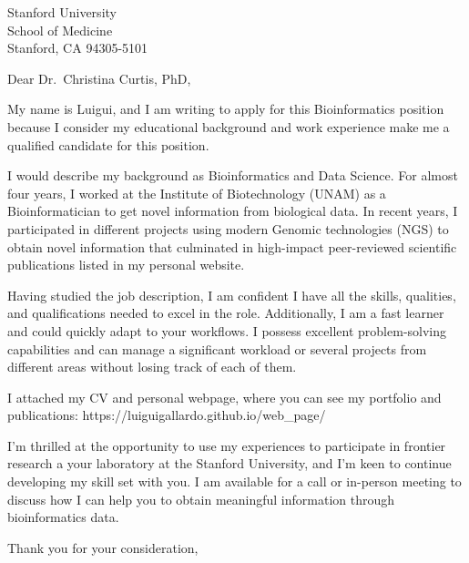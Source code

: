 \documentclass[version=last,12pt,{"/Library/Frameworks/R.framework/Versions/4.1-arm64/Resources/library/komaletter/rmarkdown/templates/pdf/resources/maintainersDelight"},]{scrlttr2}
\begin{document}
\begin{letter}{Stanford University\\School of Medicine\\Stanford, CA
94305-5101}
\opening{Dear Dr.~Christina Curtis, PhD,}

My name is Luigui, and I am writing to apply for this Bioinformatics
position because I consider my educational background and work
experience make me a qualified candidate for this position.

I would describe my background as Bioinformatics and Data Science. For
almost four years, I worked at the Institute of Biotechnology (UNAM) as
a Bioinformatician to get novel information from biological data. In
recent years, I participated in different projects using modern Genomic
technologies (NGS) to obtain novel information that culminated in
high-impact peer-reviewed scientific publications listed in my personal
website.

Having studied the job description, I am confident I have all the
skills, qualities, and qualifications needed to excel in the role.
Additionally, I am a fast learner and could quickly adapt to your
workflows. I possess excellent problem-solving capabilities and can
manage a significant workload or several projects from different areas
without losing track of each of them.

I attached my CV and personal webpage, where you can see my portfolio
and publications: https://luiguigallardo.github.io/web\_page/

I'm thrilled at the opportunity to use my experiences to participate in
frontier research a your laboratory at the Stanford University, and I'm
keen to continue developing my skill set with you. I am available for a
call or in-person meeting to discuss how I can help you to obtain
meaningful information through bioinformatics data.

\closing{Thank you for your consideration,}




\end{letter}
\end{document}
